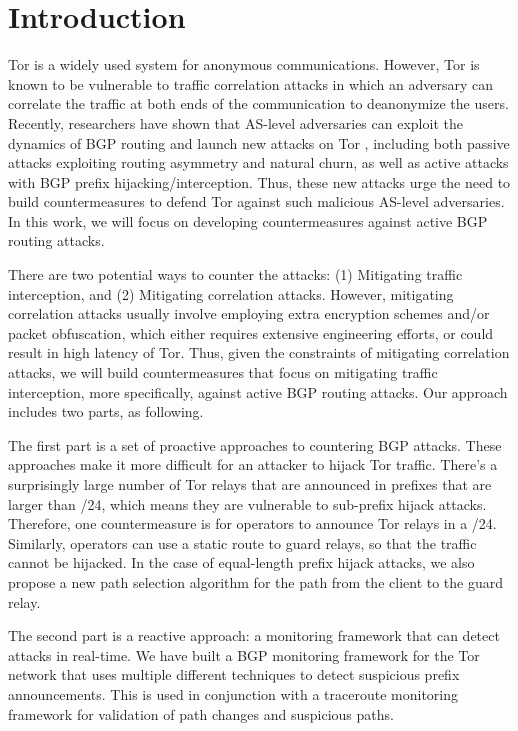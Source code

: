 \section{Introduction}

Tor is a widely used system for anonymous communications. However, Tor is known to be vulnerable to traffic correlation attacks in which an adversary can correlate the traffic at both ends of the communication to deanonymize the users. Recently, researchers have shown that AS-level adversaries can exploit the dynamics of BGP routing and launch new attacks on Tor \cite{sun2015raptor}, including both passive attacks exploiting routing asymmetry and natural churn, as well as active attacks with BGP prefix hijacking/interception. Thus, these new attacks urge the need to build countermeasures to defend Tor against such malicious AS-level adversaries. In this work, we will focus on developing countermeasures against active BGP routing attacks. 

There are two potential ways to counter the attacks: (1) Mitigating traffic interception, and (2) Mitigating correlation attacks. However, mitigating correlation attacks usually involve employing extra encryption schemes and/or packet obfuscation, which either requires extensive engineering efforts, or could result in high latency of Tor. Thus, given the constraints of mitigating correlation attacks, we will build countermeasures that focus on mitigating traffic interception, more specifically, against active BGP routing attacks. Our approach includes two parts, as following. 

The first part is a set of proactive approaches to countering BGP attacks.  These approaches make it more difficult for an attacker to hijack Tor traffic.  There's a surprisingly large number of Tor relays that are announced in prefixes that are larger than /24, which means they are vulnerable to sub-prefix hijack attacks.  Therefore, one countermeasure is for operators to announce Tor relays in a /24.  Similarly, operators can use a static route to guard relays, so that the traffic cannot be hijacked.  In the case of equal-length prefix hijack attacks, we also propose a new path selection algorithm for the path from the client to the guard relay.  

The second part is a reactive approach: a monitoring framework that can detect attacks in real-time.  We have built a BGP monitoring framework for the Tor network that uses multiple different techniques to detect suspicious prefix announcements.  This is used in conjunction with a traceroute monitoring framework for validation of path changes and suspicious paths.  

